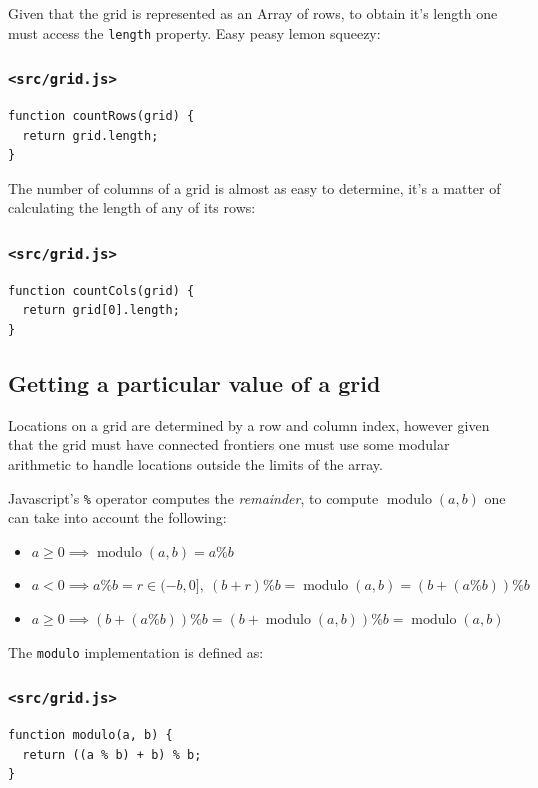 \documentclass[11pt]{article}
\DeclareMathOperator{\modulo}{modulo}
\begin{document}
Given that the grid is represented as an Array of rows, to obtain it's length one must access the \texttt{length} property. Easy peasy lemon squeezy:

\subsubsection{\texttt{<src/grid.js>}}
\label{sec:orga168000}
\begin{verbatim}
function countRows(grid) {
  return grid.length;
}
\end{verbatim}

The number of columns of a grid is almost as easy to determine, it's a matter of calculating the length of any of its rows:

\subsubsection{\texttt{<src/grid.js>}}
\label{sec:orgec5060f}
\begin{verbatim}
function countCols(grid) {
  return grid[0].length;
}
\end{verbatim}

\subsection{Getting a particular value of a grid}
\label{sec:org687912e}

Locations on a grid are determined by a row and column index, however given that the grid must have connected frontiers one must use some modular arithmetic to handle locations outside the limits of the array.

Javascript's \texttt{\%} operator computes the \emph{remainder}, to compute \(\modulo(a,b)\) one can take into account the following:
\begin{itemize}
\item \(a \geq 0 \implies \modulo(a,b) = a \% b\)
\item \(a < 0 \implies a \% b = r \in (-b,0],\ (b+r)\%b = \modulo(a,b) = (b + (a \% b)) \% b\)
\item \(a \geq 0 \implies (b + (a \% b)) \% b = (b + \modulo(a,b)) \% b = \modulo(a,b)\)
\end{itemize}

The \texttt{modulo} implementation is defined as:

\subsubsection{\texttt{<src/grid.js>}}
\label{sec:org699d222}
\begin{verbatim}
function modulo(a, b) {
  return ((a % b) + b) % b;
}
\end{verbatim}
\end{document}
